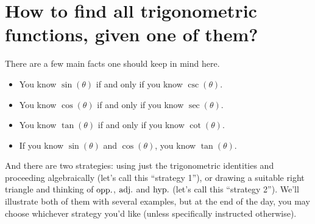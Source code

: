 \documentclass{ximera}
\begin{document}
\section{How to find all trigonometric functions, given one of them?}

There are a few main facts one should keep in mind here.
\begin{itemize}
\item You know $\sin(\theta)$ if and only if you know $\csc(\theta)$.
\item You know $\cos(\theta)$ if and only if you know $\sec(\theta)$.
\item You know $\tan(\theta)$ if and only if you know $\cot(\theta)$.
\item If you know $\sin(\theta)$ and $\cos(\theta)$, you know $\tan(\theta)$.
\end{itemize}

And there are two strategies: using just the trigonometric identities and proceeding algebraically (let's call this ``strategy 1''), or drawing a suitable right triangle and thinking of ${\rm opp.}$, ${\rm adj.}$ and ${\rm hyp.}$ (let's call this ``strategy 2''). We'll illustrate both of them with several examples, but at the end of the day, you may choose whichever strategy you'd like (unless specifically instructed otherwise).
\end{document}
